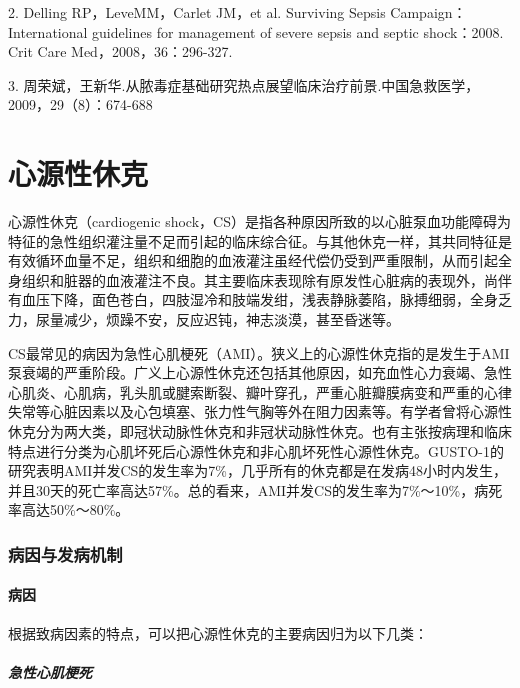 2. Delling RP，LeveMM，Carlet JM，et al. Surviving Sepsis
Campaign：International guidelines for management of severe sepsis and
septic shock：2008. Crit Care Med，2008，36：296-327.

3.
周荣斌，王新华.从脓毒症基础研究热点展望临床治疗前景.中国急救医学，2009，29（8）：674-688

\protect\hypertarget{text00059.html}{}{}

\chapter{心源性休克}

心源性休克（cardiogenic
shock，CS）是指各种原因所致的以心脏泵血功能障碍为特征的急性组织灌注量不足而引起的临床综合征。与其他休克一样，其共同特征是有效循环血量不足，组织和细胞的血液灌注虽经代偿仍受到严重限制，从而引起全身组织和脏器的血液灌注不良。其主要临床表现除有原发性心脏病的表现外，尚伴有血压下降，面色苍白，四肢湿冷和肢端发绀，浅表静脉萎陷，脉搏细弱，全身乏力，尿量减少，烦躁不安，反应迟钝，神志淡漠，甚至昏迷等。

CS最常见的病因为急性心肌梗死（AMI）。狭义上的心源性休克指的是发生于AMI泵衰竭的严重阶段。广义上心源性休克还包括其他原因，如充血性心力衰竭、急性心肌炎、心肌病，乳头肌或腱索断裂、瓣叶穿孔，严重心脏瓣膜病变和严重的心律失常等心脏因素以及心包填塞、张力性气胸等外在阻力因素等。有学者曾将心源性休克分为两大类，即冠状动脉性休克和非冠状动脉性休克。也有主张按病理和临床特点进行分类为心肌坏死后心源性休克和非心肌坏死性心源性休克。GUSTO-1的研究表明AMI并发CS的发生率为7\%，几乎所有的休克都是在发病48小时内发生，并且30天的死亡率高达57\%。总的看来，AMI并发CS的发生率为7\%～10\%，病死率高达50\%～80\%。

\subsection{病因与发病机制}

\subsubsection{病因}

根据致病因素的特点，可以把心源性休克的主要病因归为以下几类：

\paragraph{急性心肌梗死}

